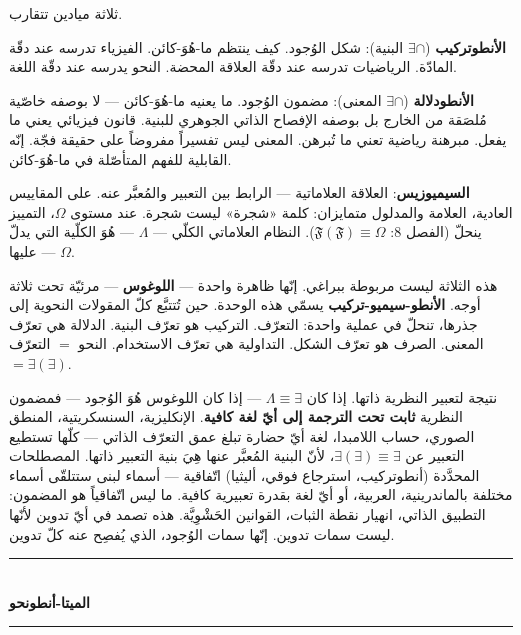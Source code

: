 \documentclass[10pt, openany, oneside]{book}
\renewcommand{\normalsize}{\fontsize{10}{13}\selectfont}
\begin{document}
\vspace{1em}

\noindent ثلاثة ميادين تتقارب.

\textbf{الأنطوتركيب} ($\exists \cap$ البنية): شكل الوُجود. كيف ينتظم ما-هُوَ-كائن. الفيزياء تدرسه عند دقّة المادّة. الرياضيات تدرسه عند دقّة العلاقة المحضة. النحو يدرسه عند دقّة اللغة.

\textbf{الأنطودلالة} ($\exists \cap$ المعنى): مضمون الوُجود. ما يعنيه ما-هُوَ-كائن --- لا بوصفه خاصّية مُلصَقة من الخارج بل بوصفه الإفصاح الذاتي الجوهري للبنية. قانون فيزيائي يعني ما يفعل. مبرهنة رياضية تعني ما تُبرهن. المعنى ليس تفسيراً مفروضاً على حقيقة فجّة. إنّه القابلية للفهم المتأصّلة في ما-هُوَ-كائن.

\textbf{السيميوزيس}: العلاقة العلاماتية --- الرابط بين التعبير والمُعبَّر عنه. على المقاييس العادية، العلامة والمدلول متمايزان: كلمة «شجرة» ليست شجرة. عند مستوى $\Omega$، التمييز ينحلّ (الفصل 8: $\mathfrak{F}(\mathfrak{F}) \equiv \Omega$). النظام العلاماتي الكلّي --- $\Lambda$ --- هُوَ الكلّية التي يدلّ عليها --- $\Omega$.

هذه الثلاثة ليست مربوطة ببراغي. إنّها ظاهرة واحدة --- \textbf{اللوغوس} --- مرئيّة تحت ثلاثة أوجه. \textbf{الأنطو-سيميو-تركيب} يسمّي هذه الوحدة. حين تُتتبَّع كلّ المقولات النحوية إلى جذرها، تنحلّ في عملية واحدة: التعرّف. التركيب هو تعرّف البنية. الدلالة هي تعرّف المعنى. الصرف هو تعرّف الشكل. التداولية هي تعرّف الاستخدام. النحو $=$ التعرّف $= \exists(\exists)$.

نتيجة لتعبير النظرية ذاتها. إذا كان $\Lambda \equiv \exists$ --- إذا كان اللوغوس هُوَ الوُجود --- فمضمون النظرية \textbf{ثابت تحت الترجمة إلى أيّ لغة كافية}. الإنكليزية، السنسكريتية، المنطق الصوري، حساب اللامبدا، لغة أيّ حضارة تبلغ عمق التعرّف الذاتي --- كلّها تستطيع التعبير عن $\exists(\exists) \equiv \exists$، لأنّ البنية المُعبَّر عنها هِيَ بنية التعبير ذاتها. المصطلحات المحدَّدة (أنطوتركيب، استرجاع فوقي، أليثيا) اتّفاقية --- أسماء لبنى ستتلقّى أسماء مختلفة بالماندرينية، العربية، أو أيّ لغة بقدرة تعبيرية كافية. ما ليس اتّفاقياً هو المضمون: التطبيق الذاتي، انهيار نقطة الثبات، القوانين الحَشْوِيَّة. هذه تصمد في أيّ تدوين لأنّها ليست سمات تدوين. إنّها سمات الوُجود، الذي يُفصِح عنه كلّ تدوين.

\vspace{1.5em}


\begin{center}
    \rule{0.3\textwidth}{0.4pt}\\[0.5em]
    {\normalsize\bfseries الميتا-أنطونحو}\\[0.3em]
    \rule{0.3\textwidth}{0.4pt}
\end{center}
\end{document}
